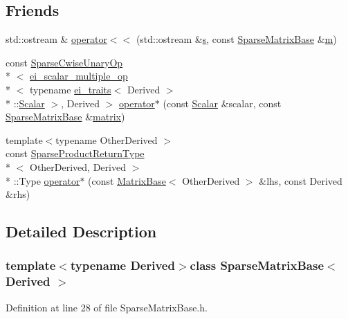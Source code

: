 \subsection*{Friends}
\begin{DoxyCompactItemize}
\item 
std\-::ostream \& \hyperlink{class_sparse_matrix_base_a34261623108465eab7a7290ddee9d111}{operator$<$$<$} (std\-::ostream \&\hyperlink{glext_8h_ad585a1393cfa368fa9dc3d8ebff640d5}{s}, const \hyperlink{class_sparse_matrix_base}{Sparse\-Matrix\-Base} \&\hyperlink{glext_8h_af593500c283bf1a787a6f947f503a5c2}{m})
\item 
const \hyperlink{class_sparse_cwise_unary_op}{Sparse\-Cwise\-Unary\-Op}\\*
$<$ \hyperlink{structei__scalar__multiple__op}{ei\-\_\-scalar\-\_\-multiple\-\_\-op}\\*
$<$ typename \hyperlink{structei__traits}{ei\-\_\-traits}$<$ Derived $>$\\*
\-::\hyperlink{class_sparse_matrix_base_af39d70f2b7e775e9e17b666cd24128c8}{Scalar} $>$, Derived $>$ \hyperlink{class_sparse_matrix_base_af810cce95f5dc77d23efb9584b8847bc}{operator$\ast$} (const \hyperlink{class_sparse_matrix_base_af39d70f2b7e775e9e17b666cd24128c8}{Scalar} \&scalar, const \hyperlink{class_sparse_matrix_base}{Sparse\-Matrix\-Base} \&\hyperlink{glext_8h_a7b24a3f2f56eb1244ae69dacb4fecb6f}{matrix})
\item 
{\footnotesize template$<$typename Other\-Derived $>$ }\\const \hyperlink{struct_sparse_product_return_type}{Sparse\-Product\-Return\-Type}\\*
$<$ Other\-Derived, Derived $>$\\*
\-::Type \hyperlink{class_sparse_matrix_base_adabdfe24aeb2f70726ff184a991c1dbc}{operator$\ast$} (const \hyperlink{class_matrix_base}{Matrix\-Base}$<$ Other\-Derived $>$ \&lhs, const Derived \&rhs)
\end{DoxyCompactItemize}


\subsection{Detailed Description}
\subsubsection*{template$<$typename Derived$>$class Sparse\-Matrix\-Base$<$ Derived $>$}



Definition at line 28 of file Sparse\-Matrix\-Base.\-h.



